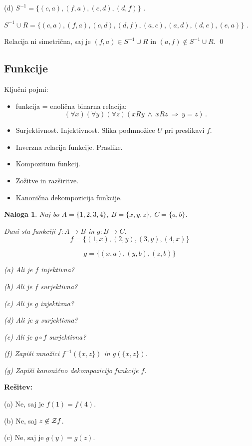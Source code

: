 \documentclass[11pt,paper=b5,DIV=13,headinclude,footinclude]{scrbook}
\def\inn {{~\wedge~}}
\def\sledi {{~\Rightarrow~}}
\newtheorem*{problem}{Naloga}
\begin{document}
(d)
$S^{-1} = \{(c, a), (f, a), (c, d), (d, f)\}$ .

$S^{-1}\cup R = \{(c, a), (f, a), (c, d), (d, f),
(a, c), (a, d), (d, e), (e, a)\}$ .

Relacija ni simetrična, saj je $(f,a)\in S^{-1}\cup R$ in $(a,f)\not\in S^{-1}\cup R$.
\qed


\subsection{Funkcije}

Ključni pojmi:
\begin{itemize}
  \item funkcija = enolična binarna relacija:
  $$(\forall x)(\forall y)(\forall z)(xRy\inn xRz\sledi y = z)\,.$$
  \item Surjektivnost. Injektivnost. Slika podmnožice $U$ pri preslikavi $f$.
  \item Inverzna relacija funkcije. Praslike.
  \item Kompozitum funkcij.
  \item Zožitve in razširitve.
  \item Kanonična dekompozicija funkcije.
\end{itemize}

\begin{problem}
Naj bo $A = \{1,2,3,4\}$, $B = \{x,y,z\}$, $C = \{a,b\}$.

Dani sta funkciji $f:A\to B$ in $g:B\to C$.
$$f = \{(1,x),(2,y),(3,y),(4,x)\}$$

$$g = \{(x,a),(y,b),(z,b)\}$$

(a) Ali je $f$ injektivna?

(b) Ali je $f$ surjektivna?

(c) Ali je $g$ injektivna?

(d) Ali je $g$ surjektivna?

(e) Ali je $g\circ f$ surjektivna?

(f) Zapiši množici $f^{-1}(\{x,z\})$ in $g(\{x,z\})$.

(g) Zapiši kanonično dekompozicijo funkcije $f$.
\end{problem}

\textbf{Rešitev:}

(a) Ne, saj je $f(1) = f(4)$.

(b) Ne, saj $z\not\in{\cal Z} f$.

(c) Ne, saj je $g(y) = g(z)$.
\end{document}
